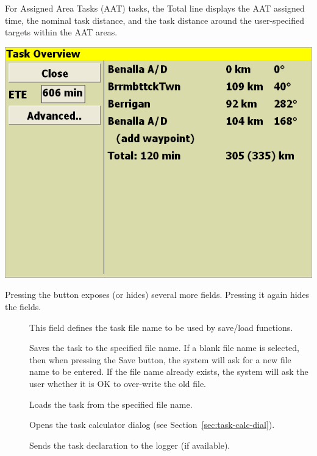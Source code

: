 \documentclass[a4paper,12pt]{refrep}
\begin{document}
For Assigned Area Tasks (AAT) tasks, the Total line displays the AAT
assigned time, the nominal task distance, and the task distance around
the user-specified targets within the AAT areas.

\begin{center}
\includegraphics[angle=0,width=\linewidth,keepaspectratio='true']{figures/dialog-taskedit1.png}
\end{center}

Pressing the  button exposes (or hides) several more
fields.  Pressing it again hides the fields.
\begin{description}
\item[] This field defines the task file name to be used by save/load functions.  
\item[] Saves the task to the specified file name.  If a blank file name is selected, then when pressing the Save button, the system will ask for a new file name to be entered.  If the file name already exists, the system will ask the user whether it is OK to over-write the old file.
\item[] Loads the task from the specified file name.
\item[] Opens the task calculator dialog (see Section~\ref{sec:task-calc-dial}).
\item[] Sends the task declaration to the logger (if available).
\end{description} 
\end{document}
